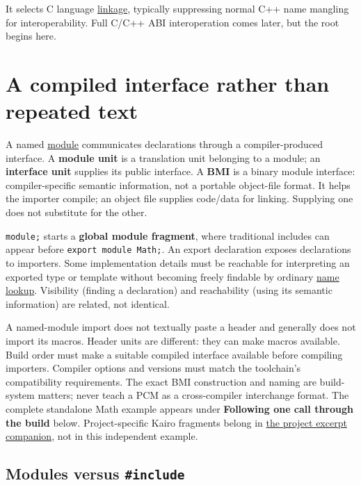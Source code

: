 It selects C language \hyperref[appendix-74a0ec818c18]{linkage}, typically suppressing normal C++ name mangling for interoperability. Full C/C++ ABI interoperation comes later, but the root begins here.

\section{A compiled interface rather than repeated text}\label{05-engine-i-ch002-a-compiled-interface-rather-than-repeated-text}

A named \hyperref[appendix-410a611a5b8d]{module} communicates declarations through a compiler-produced interface. A \textbf{module unit} is a translation unit belonging to a module; an \textbf{interface unit} supplies its public interface. A \textbf{BMI} is a binary module interface: compiler-specific semantic information, not a portable object-file format. It helps the importer compile; an object file supplies code/data for linking. Supplying one does not substitute for the other.

\texttt{module;} starts a \textbf{global module fragment}, where traditional includes can appear before \texttt{export\ module\ Math;}. An export declaration exposes declarations to importers. Some implementation details must be reachable for interpreting an exported type or template without becoming freely findable by ordinary \hyperref[appendix-b12b31759da1]{name lookup}. Visibility (finding a declaration) and reachability (using its semantic information) are related, not identical.

A named-module import does not textually paste a header and generally does not import its macros. Header units are different: they can make macros available. Build order must make a suitable compiled interface available before compiling importers. Compiler options and versions must match the toolchain's compatibility requirements. The exact BMI construction and naming are build-system matters; never teach a PCM as a cross-compiler interchange format. The complete standalone Math example appears under \textbf{Following one call through the build} below. Project-specific Kairo fragments belong in \hyperref[appendix-4e2236f53445-source-reported-c-project-excerpts]{the project excerpt companion}, not in this independent example.

\subsection{\texorpdfstring{Modules versus \texttt{\#include}}{Modules versus \#include}}\label{05-engine-i-ch002-modules-versus-include}

